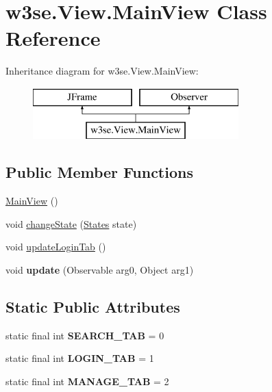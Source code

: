 \hypertarget{classw3se_1_1_view_1_1_main_view}{\section{w3se.\-View.\-Main\-View Class Reference}
\label{classw3se_1_1_view_1_1_main_view}
}
Inheritance diagram for w3se.\-View.\-Main\-View\-:\begin{figure}[H]
\begin{center}
\leavevmode
\includegraphics[height=2.000000cm]{classw3se_1_1_view_1_1_main_view}
\end{center}
\end{figure}
\subsection*{Public Member Functions}
\begin{DoxyCompactItemize}
\item 
\hyperlink{classw3se_1_1_view_1_1_main_view_a9a542efe1ab124e0ddbd336770895c91}{Main\-View} ()
\item 
void \hyperlink{classw3se_1_1_view_1_1_main_view_a4a01c01f405970a8a450e2224bd6e313}{change\-State} (\hyperlink{enumw3se_1_1_model_1_1_base_1_1_states}{States} state)
\item 
void \hyperlink{classw3se_1_1_view_1_1_main_view_a43ba181a3161996fe0d9351b924cf2eb}{update\-Login\-Tab} ()
\item 
\hypertarget{classw3se_1_1_view_1_1_main_view_a09643f3e5d3becea16d9cd7d3fecf989}{void {\bfseries update} (Observable arg0, Object arg1)}\label{classw3se_1_1_view_1_1_main_view_a09643f3e5d3becea16d9cd7d3fecf989}

\end{DoxyCompactItemize}
\subsection*{Static Public Attributes}
\begin{DoxyCompactItemize}
\item 
\hypertarget{classw3se_1_1_view_1_1_main_view_aec7bcfbdf36c00fa188459ea83d21ee6}{static final int {\bfseries S\-E\-A\-R\-C\-H\-\_\-\-T\-A\-B} = 0}\label{classw3se_1_1_view_1_1_main_view_aec7bcfbdf36c00fa188459ea83d21ee6}

\item 
\hypertarget{classw3se_1_1_view_1_1_main_view_a147b21453bbfaa9cec1b45aecb2c1857}{static final int {\bfseries L\-O\-G\-I\-N\-\_\-\-T\-A\-B} = 1}\label{classw3se_1_1_view_1_1_main_view_a147b21453bbfaa9cec1b45aecb2c1857}

\item 
\hypertarget{classw3se_1_1_view_1_1_main_view_a71bde4ed52c6b36eb317c241728d5b6a}{static final int {\bfseries M\-A\-N\-A\-G\-E\-\_\-\-T\-A\-B} = 2}\label{classw3se_1_1_view_1_1_main_view_a71bde4ed52c6b36eb317c241728d5b6a}

\end{DoxyCompactItemize}


